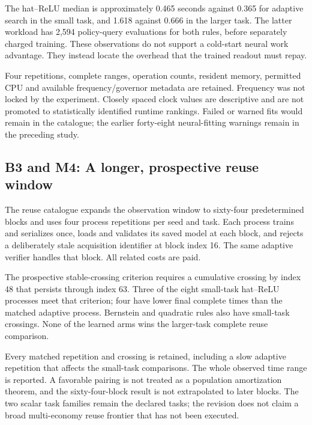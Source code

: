 \documentclass[ecta,nameyear,draft]{econsocart}
\begin{document}
The hat--ReLU median is approximately 0.465 seconds against 0.365 for
adaptive search in the small task, and 1.618 against 0.666 in the larger
task. The latter workload has 2,594 policy-query evaluations for both
rules, before separately charged training. These observations do not
support a cold-start neural work advantage. They instead locate the
overhead that the trained readout must repay.

Four repetitions, complete ranges, operation counts, resident memory,
permitted CPU and available frequency/governor metadata are retained.
Frequency was not locked by the experiment. Closely spaced clock values
are descriptive and are not promoted to statistically identified runtime
rankings. Failed or warned fits would remain in the catalogue; the
earlier forty-eight neural-fitting warnings remain in the preceding
study.

\hypertarget{b3-and-m4-a-longer-prospective-reuse-window}{%
\subsection{B3 and M4: A longer, prospective reuse
window}\label{b3-and-m4-a-longer-prospective-reuse-window}}

The reuse catalogue expands the observation window to sixty-four
predetermined blocks and uses four process repetitions per seed and
task. Each process trains and serializes once, loads and validates its
saved model at each block, and rejects a deliberately stale acquisition
identifier at block index 16. The same adaptive verifier handles that
block. All related costs are paid.

The prospective stable-crossing criterion requires a cumulative crossing
by index 48 that persists through index 63. Three of the eight
small-task hat--ReLU processes meet that criterion; four have lower
final complete times than the matched adaptive process. Bernstein and
quadratic rules also have small-task crossings. None of the learned arms
wins the larger-task complete reuse comparison.

Every matched repetition and crossing is retained, including a slow
adaptive repetition that affects the small-task comparisons. The whole
observed time range is reported. A favorable pairing is not treated as a
population amortization theorem, and the sixty-four-block result is not
extrapolated to later blocks. The two scalar task families remain the
declared tasks; the revision does not claim a broad multi-economy reuse
frontier that has not been executed.
\end{document}
